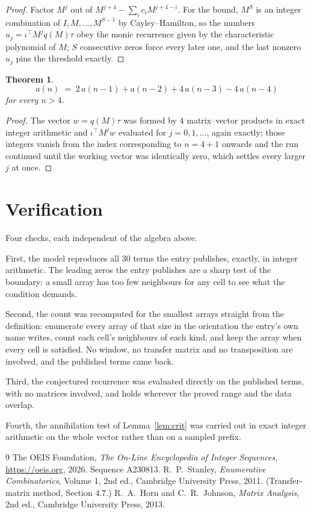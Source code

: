 \documentclass[11pt,a4paper]{article}
\theoremstyle{plain}
\newtheorem{theorem}{Theorem}
\theoremstyle{definition}
\begin{document}
\begin{proof}
Factor $M^{j}$ out of $M^{j+4}-\sum_ic_iM^{j+4-i}$. For the bound, $M^{S}$
is an integer combination of $I,M,\dots,M^{S-1}$ by Cayley--Hamilton, so the numbers
$u_j=\iota^{\!\top}M^{j}q(M)\tau$ obey the monic recurrence given by the characteristic
polynomial of $M$; $S$ consecutive zeros force every later one, and the last nonzero $u_j$
pins the threshold exactly.
\end{proof}

\begin{theorem}
\[
a(n)\;=\;2\,a(n-1) + a(n-2) + 4\,a(n-3) - 4\,a(n-4)
\]
for every $n>4$.
\end{theorem}

\begin{proof}
The vector $w=q(M)\tau$ was formed by $4$ matrix--vector products in exact integer
arithmetic and $\iota^{\!\top}M^{j}w$ evaluated for $j=0,1,\dots$, again exactly; those
integers vanish from the index corresponding to $n=4+1$ onwards and the run continued
until the working vector was identically zero, which settles every larger $j$ at once.
\end{proof}

\section{Verification}

Four checks, each independent of the algebra above.

First, the model reproduces all $30$ terms the entry publishes, exactly, in integer
arithmetic. The leading zeros the entry publishes are a sharp test of the boundary: a small
array has too few neighbours for any cell to see what the condition demands.

Second, the count was recomputed for the smallest arrays straight from the definition:
enumerate every array of that size in the orientation the entry's own name writes, count each
cell's neighbours of each kind, and keep the array when every cell is satisfied. No window, no
transfer matrix and no transposition are involved, and the published terms came back.

Third, the conjectured recurrence was evaluated directly on the published terms, with no
matrices involved, and holds wherever the proved range and the data overlap.

Fourth, the annihilation test of Lemma~\ref{lem:crit} was carried out in exact integer
arithmetic on the whole vector rather than on a sampled prefix.

\begin{thebibliography}{9}
 The OEIS Foundation, \emph{The On-Line Encyclopedia of Integer
Sequences}, \url{https://oeis.org}, 2026. Sequence A230813.
 R.~P.~Stanley, \emph{Enumerative Combinatorics}, Volume 1, 2nd ed.,
Cambridge University Press, 2011. (Transfer-matrix method, Section 4.7.)
 R.~A.~Horn and C.~R.~Johnson, \emph{Matrix Analysis}, 2nd ed., Cambridge
University Press, 2013.
\end{thebibliography}
\end{document}
